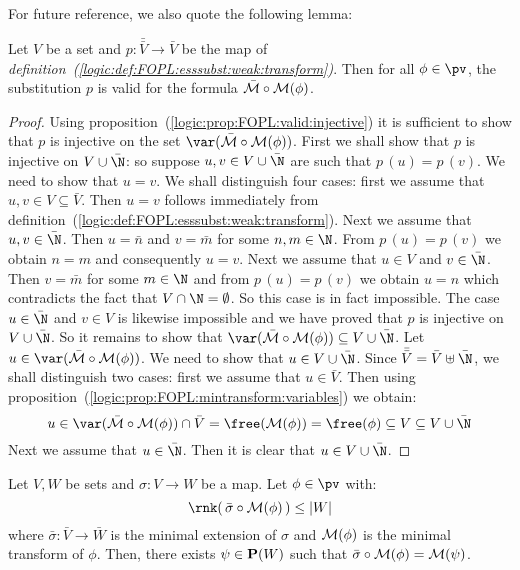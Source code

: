 For future reference, we also quote the following lemma:
\begin{lemma}\label{logic:lemma:FOPL:esssubst:p:valid}
Let $V$ be a set and $p:\bar{\bar{V}}\to\bar{V}$ be the map of {\em
definition~(\ref{logic:def:FOPL:esssubst:weak:transform})}. Then for
all $\phi\in\pv$, the substitution $p$ is valid for the formula
$\bar{\cal M}\circ{\cal M}(\phi)$.
\end{lemma}
\begin{proof}
Using proposition~(\ref{logic:prop:FOPL:valid:injective}) it is
sufficient to show that $p$ is injective on the set $\var(\bar{\cal
M}\circ{\cal M}(\phi))$. First we shall show that $p$ is injective
on $V\cup\bar{\N}$: so suppose $u,v\in V\cup\bar{\N}$ are such that
$p\,(u)=p\,(v)$. We need to show that $u=v$. We shall distinguish
four cases: first we assume that $u,v\in V\subseteq\bar{V}$. Then
$u=v$ follows immediately from
definition~(\ref{logic:def:FOPL:esssubst:weak:transform}). Next we
assume that $u,v\in\bar{\N}$. Then $u=\bar{n}$ and $v=\bar{m}$ for
some $n,m\in\N$. From $p\,(u)=p\,(v)$ we obtain $n=m$ and
consequently $u=v$. Next we assume that $u\in V$ and $v\in\bar{\N}$.
Then $v=\bar{m}$ for some $m\in\N$ and from $p\,(u)=p\,(v)$ we
obtain $u=n$ which contradicts the fact that $V\cap\N=\emptyset$. So
this case is in fact impossible. The case $u\in\bar{\N}$ and $v\in
V$ is likewise impossible and we have proved that $p$ is injective
on $V\cup\bar{\N}$. So it remains to show that $\var(\bar{\cal
M}\circ{\cal M}(\phi))\subseteq V\cup\bar{\N}$. Let
$u\in\var(\bar{\cal M}\circ{\cal M}(\phi))$. We need to show that
$u\in V\cup\bar{\N}$. Since $\bar{\bar{V}}=\bar{V}\uplus\bar{\N}$,
we shall distinguish two cases: first we assume that $u\in\bar{V}$.
Then using
proposition~(\ref{logic:prop:FOPL:mintransform:variables}) we
obtain:
    \[
    u\in\var(\bar{\cal M}\circ{\cal
    M}(\phi))\cap\bar{V}=\free({\cal M}(\phi))=\free(\phi)\subseteq
    V\subseteq V\cup\bar{\N}
    \]
Next we assume that $u\in\bar{\N}$. Then it is clear that $u\in
V\cup\bar{\N}$.
\end{proof}
\begin{theorem}\label{logic:the:FOPL:esssubst:key}
Let $V,W$ be sets and $\sigma:V\to W$ be a map. Let $\phi\in\pv$
with:
    \[
    \rnk(\,\bar{\sigma}\circ{\cal M}(\phi)\,)\leq|W|
    \]
where $\bar{\sigma}:\bar{V}\to\bar{W}$ is the minimal extension of
$\sigma$ and ${\cal M}(\phi)$ is the minimal transform of $\phi$.
Then, there exists $\psi\in{\bf P}(W)$ such that
$\bar{\sigma}\circ{\cal M}(\phi)={\cal M}(\psi)$.
\end{theorem}
